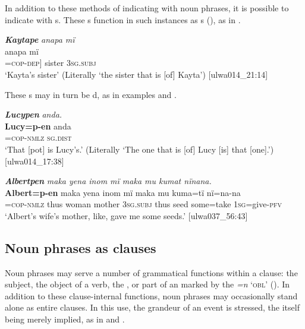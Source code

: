   In addition to these methods of indicating  with noun phrases, it is possible to indicate  with s. These s function in such instances as s (), as in .

\ea%
    \label{ex:phrase:35}
          \textbf{\textit{Kaytape}} \textit{anapa mï}\\
\gll    [\textbf{Kayta=p-e}]      anapa  mï\\
    [[name]=\textsc{cop-dep]}  sister  \textsc{3sg.subj}\\
\glt `Kayta’s sister’ (Literally ‘the sister that is [of] Kayta’) [ulwa014\_21:14]
\z

These s may in turn be d, as in examples  and .

\ea%
    \label{ex:phrase:36}
          \textbf{\textit{Lucypen}} \textit{anda.}\\
\gll    \textbf{Lucy=p-en}      anda\\
    [name]=\textsc{cop-nmlz}  \textsc{sg.dist}\\
\glt `That [pot] is Lucy’s.’ (Literally ‘The one that is [of] Lucy [is] that [one].’) [ulwa014\_17:38]
\z

\ea%
    \label{ex:phrase:37}
          \textbf{\textit{Albertpen}} \textit{maka yena inom mï maka mu kumat nïnana.}\\
\gll    \textbf{Albert=p-en}      maka  yena    inom    mï      maka mu    kuma=tï  nï=na-na\\
    [name]=\textsc{cop-nmlz}  thus  woman    mother    3\textsc{sg.subj}  thus    seed  some=take  1\textsc{sg}=give-\textsc{pfv}\\
\glt `Albert’s wife’s mother, like, gave me some seeds.’ [ulwa037\_56:43]
\z


\subsection{Noun phrases as clauses}\label{sec:9.1.6}


Noun phrases may serve a number of grammatical functions within a clause: the subject, the object of a verb, the , or part of an   marked by the  \textit{=n} ‘\textsc{obl}’ (). In addition to these clause-internal functions, noun phrases may occasionally stand alone as entire clauses. In this use, the grandeur of an event is stressed, the  itself being merely implied, as in  and .

